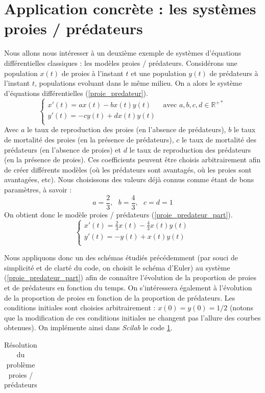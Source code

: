 \documentclass[a4paper,10pt]{report}
\begin{document}
\section{Application concrète : les systèmes proies / prédateurs}
Nous allons nous intéresser à un deuxième exemple de systèmes d'équations différentielles classiques : les modèles proies / prédateurs. Considérons une population $x(t)$ de proies à l'instant $t$ et une population $y(t)$ de prédateurs à l'instant $t$, populations evoluant dans le même milieu. On a alors le système d'équations différentielles (\ref{proie_predateur}). \\
\begin{equation}
\label{proie_predateur}
\left\lbrace
\begin{array}{l}
x'(t)=ax(t)-bx(t)y(t)  \ \ \ \ \ \ \text{ avec } a,b,c,d \in \mathbb{R}^{+*}\\
y'(t)=-cy(t)+dx(t)y(t) \\
\end{array}\right.
\end{equation}
Avec $a$ le taux de reproduction des proies (en l'absence de prédateurs), $b$ le taux de mortalité des proies (en la présence de prédateurs), $c$ le taux de mortalité des prédateurs (en l'absence de proies) et $d$ le taux de reproduction des prédateurs (en la présence de proies). Ces coefficients peuvent être choisis arbitrairement afin de créer différents modèles (où les prédateurs sont avantagés, où les proies sont avantagées, etc). Nous choisissons des valeurs déjà connus comme étant de bons paramètres, à savoir :
\begin{equation}
a=\frac{2}{3}, \ \ \ b=\frac{4}{3}, \ \ \ c=d=1
\end{equation}
On obtient donc le modèle proies / prédateurs (\ref{proie_predateur_part}). \\
\begin{equation}
\label{proie_predateur_part}
\left\lbrace
\begin{array}{l}
x'(t)=\frac{2}{3}x(t)-\frac{4}{3}x(t)y(t) \\
y'(t)=-y(t)+x(t)y(t) \\
\end{array}\right.
\end{equation}

\indent Nous appliquons donc un des schémas étudiés précédemment (par souci de simplicité et de clarté du code, on choisit le schéma d'Euler) au système (\ref{proie_predateur_part}) afin de connaître l'évolution de la proportion de proies et de prédateurs en fonction du temps. On s'intéressera également à l'évolution de la proportion de proies en fonction de la proportion de prédateurs. Les conditions initiales sont choisies arbitrairement : $x(0)=y(0)=1/2$ (notons que la modification de ces conditions initiales ne changent pas l'allure des courbes obtenues). On implémente ainsi dans \textit{Scilab} le code \ref{code_proie-predateur}.
\begin{table}[H]
\caption{Résolution du problème proies / prédateurs}
\begin{tabular}{l}

\label{code_proie-predateur}
\end{tabular}
\end{table}
\end{document}
